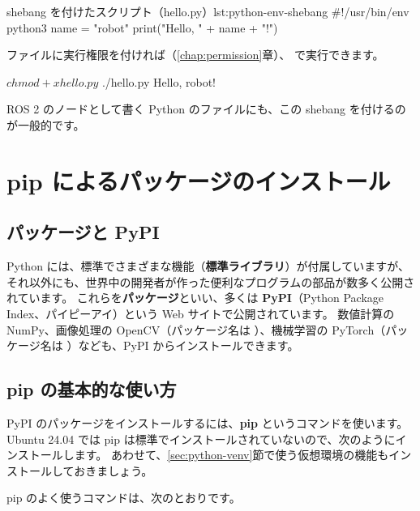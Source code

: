 \begin{codelisting}[style=python]{shebang を付けたスクリプト（hello.py）}{lst:python-env-shebang}
#!/usr/bin/env python3
name = "robot"
print("Hello, " + name + "!")
\end{codelisting}

ファイルに実行権限を付ければ（\ref{chap:permission}章）、 で実行できます。

\begin{terminal}[スクリプトを直接実行する]
$ chmod +x hello.py
$ ./hello.py
Hello, robot!
\end{terminal}

ROS 2 のノードとして書く Python のファイルにも、この shebang を付けるのが一般的です。

\section{pip によるパッケージのインストール}
\label{sec:python-pip}

\subsection{パッケージと PyPI}

Python には、標準でさまざまな機能（\textbf{標準ライブラリ}）が付属していますが、それ以外にも、世界中の開発者が作った便利なプログラムの部品が数多く公開されています。
これらを\textbf{パッケージ}といい、多くは \textbf{PyPI}（Python Package Index、パイピーアイ）という Web サイトで公開されています。
数値計算の NumPy、画像処理の OpenCV（パッケージ名は ）、機械学習の PyTorch（パッケージ名は ）なども、PyPI からインストールできます。

\subsection{pip の基本的な使い方}

PyPI のパッケージをインストールするには、\textbf{pip} というコマンドを使います。
Ubuntu 24.04 では pip は標準でインストールされていないので、次のようにインストールします。
あわせて、\ref{sec:python-venv}節で使う仮想環境の機能もインストールしておきましょう。


pip のよく使うコマンドは、次のとおりです。

